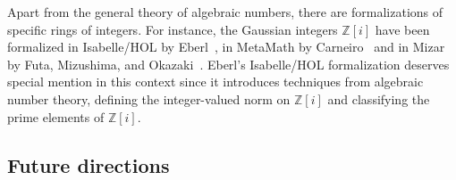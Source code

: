 \documentclass[sn-mathphys]{sn-jnl}%
\renewcommand{\Z}{\mathbb{Z}}
\begin{document}
Apart from the general theory of algebraic numbers, there are formalizations of specific rings of integers.
For instance, the Gaussian integers $\Z[i]$ have been formalized
in Isabelle/HOL by Eberl~\cite{gaussian_integers-isabelle},
in MetaMath by Carneiro~\cite{gaussian_integers-metamath}
and in Mizar by Futa, Mizushima, and Okazaki~\cite{gaussian_integers-mizar}.
Eberl's Isabelle/HOL formalization deserves special mention in this context since it introduces techniques from algebraic number theory,
defining the integer-valued norm on $\Z[i]$ and classifying the prime elements of $\Z[i]$.

\subsection{Future directions}\label{sec:future_directions}
\end{document}
